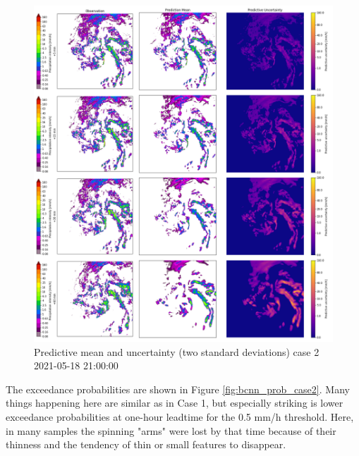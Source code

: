 \begin{figure}[H]
	\centering
	\includegraphics[width=\textwidth]{images/cases/bcnn_mean_case2}
	\caption{Predictive mean and uncertainty (two standard deviations) case 2 2021-05-18 21:00:00}
	\label{fig:bcnn_mean_case2}
\end{figure}

The exceedance probabilities are shown in Figure \ref{fig:bcnn_prob_case2}. Many things happening here are similar as in Case 1, but especially striking is lower exceedance probabilities at one-hour leadtime for the 0.5 mm/h threshold. Here, in many samples the spinning "arms" were lost by that time because of their thinness and the tendency of thin or small features to disappear. 

